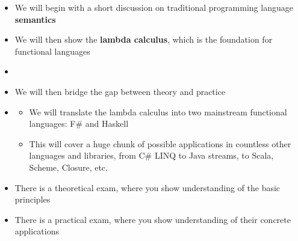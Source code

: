 \documentclass{beamer}
\begin{document}
\begin{frame}[fragile]{\CurrentSection}
\begin{block}{\CurrentSubSection}
\begin{itemize}
\item We will begin with a short discussion on traditional programming language \textbf{semantics}
\item We will then show the \textbf{lambda calculus}, which is the foundation for functional languages
\item \item We will then bridge the gap between theory and practice
 
\item \begin{exampleblock}{}
\begin{itemize}
\item We will translate the lambda calculus into two mainstream functional languages: F\# and Haskell
\item This will cover a huge chunk of possible applications in countless other languages and libraries, from C\# LINQ to Java streams, to Scala, Scheme, Closure, etc.

\end{itemize}

\end{exampleblock}


 


\end{itemize}

\end{block}


\end{frame}

\begin{frame}[fragile]{\CurrentSection}
\begin{block}{\CurrentSubSection}
\begin{itemize}
\item There is a theoretical exam, where you show understanding of the basic principles
\item There is a practical exam, where you show understanding of their concrete applications

\end{itemize}

\end{block}


\end{frame}
\end{document}
